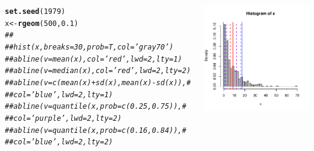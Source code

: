 \documentclass{beamer}\usepackage[]{graphicx}\usepackage[]{color}
\makeatletter
\newcommand{\hlnum}[1]{\textcolor[rgb]{0.686,0.059,0.569}{#1}}%
\newcommand{\hlcom}[1]{\textcolor[rgb]{0.678,0.584,0.686}{\textit{#1}}}%
\newcommand{\hlstd}[1]{\textcolor[rgb]{0.345,0.345,0.345}{#1}}%
\newcommand{\hlkwb}[1]{\textcolor[rgb]{0.69,0.353,0.396}{#1}}%
\newcommand{\hlkwd}[1]{\textcolor[rgb]{0.737,0.353,0.396}{\textbf{#1}}}%
\newenvironment{kframe}{%
 \def\at@end@of@kframe{}%
 \ifinner\ifhmode%
  \def\at@end@of@kframe{\end{minipage}}%
  \begin{minipage}{\columnwidth}%
 \fi\fi%
 \def\FrameCommand##1{\hskip\@totalleftmargin \hskip-\fboxsep
 \colorbox{shadecolor}{##1}\hskip-\fboxsep
     \hskip-\linewidth \hskip-\@totalleftmargin \hskip\columnwidth}%
 \MakeFramed {\advance\hsize-\width
   \@totalleftmargin\z@ \linewidth\hsize
   \@setminipage}}%
 {\par\unskip\endMakeFramed%
 \at@end@of@kframe}
\newenvironment{knitrout}{}{} %
\renewenvironment{knitrout}{\setlength{\topsep}{0mm}}{}
\makeatother
\begin{document}
\begin{frame}[fragile]%

\begin{columns}[c]


\begin{knitrout}\tiny
{}\color{fgcolor}\begin{kframe}
\begin{alltt}
\hlkwd{set.seed}\hlstd{(}\hlnum{1979}\hlstd{)}
\hlstd{x} \hlkwb{<-} \hlkwd{rgeom}\hlstd{(}\hlnum{500}\hlstd{,}\hlnum{0.1}\hlstd{)}
\hlcom{## }
\hlcom{## hist(x,breaks=30,prob=T,col='gray70')}
\hlcom{## abline(v=mean(x),col='red',lwd=2,lty=1)}
\hlcom{## abline(v=median(x),col='red',lwd=2,lty=2)}
\hlcom{## abline(v=c(mean(x)+sd(x),mean(x)-sd(x)),#}
\hlcom{##        col='blue',lwd=2,lty=1)}
\hlcom{## abline(v=quantile(x,prob=c(0.25,0.75)),#}
\hlcom{##        col='purple',lwd=2,lty=2)}
\hlcom{## abline(v=quantile(x,prob=c(0.16,0.84)),#}
\hlcom{##        col='blue',lwd=2,lty=2)}
\end{alltt}
\end{kframe}
\end{knitrout}

\centering
\begin{knitrout}
\color{fgcolor}
\includegraphics[width=1.1\linewidth]{figure/unnamed-chunk-15-1} 

\end{knitrout}

\end{columns}

\end{frame} 
\end{document}
